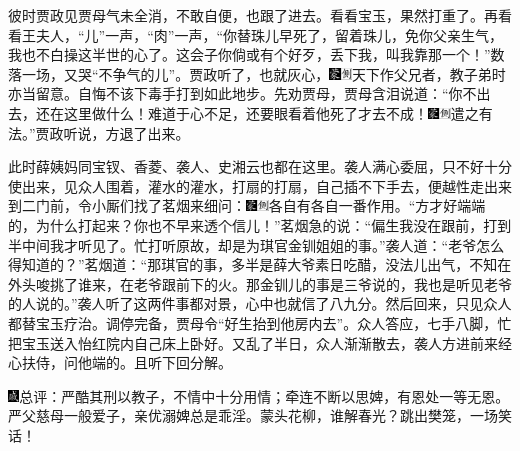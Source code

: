 彼时贾政见贾母气未全消，不敢自便，也跟了进去。看看宝玉，果然打重了。再看看王夫人，``儿''一声，``肉''一声，``你替珠儿早死了，留着珠儿，免你父亲生气，我也不白操这半世的心了。这会子你倘或有个好歹，丢下我，叫我靠那一个！''数落一场，又哭``不争气的儿''。贾政听了，也就灰心，{\includegraphics[width=3mm]{../Images/00006}\includegraphics[width=3mm]{../Images/00011}\footnotesize \kaishu 天下作父兄者，教子弟时亦当留意。}自悔不该下毒手打到如此地步。先劝贾母，贾母含泪说道：``你不出去，还在这里做什么！难道于心不足，还要眼看着他死了才去不成！{\includegraphics[width=3mm]{../Images/00006}\includegraphics[width=3mm]{../Images/00011}\footnotesize \kaishu 遣之有法。}''贾政听说，方退了出来。

此时薛姨妈同宝钗、香菱、袭人、史湘云也都在这里。袭人满心委屈，只不好十分使出来，见众人围着，灌水的灌水，打扇的打扇，自己插不下手去，便越性走出来到二门前，令小厮们找了茗烟来细问：{\includegraphics[width=3mm]{../Images/00006}\includegraphics[width=3mm]{../Images/00011}\footnotesize \kaishu 各自有各自一番作用。}``方才好端端的，为什么打起来？你也不早来透个信儿！''茗烟急的说：``偏生我没在跟前，打到半中间我才听见了。忙打听原故，却是为琪官金钏姐姐的事。''袭人道：``老爷怎么得知道的？''茗烟道：``那琪官的事，多半是薛大爷素日吃醋，没法儿出气，不知在外头唆挑了谁来，在老爷跟前下的火。那金钏儿的事是三爷说的，我也是听见老爷的人说的。''袭人听了这两件事都对景，心中也就信了八九分。然后回来，只见众人都替宝玉疗治。调停完备，贾母令``好生抬到他房内去''。众人答应，七手八脚，忙把宝玉送入怡红院内自己床上卧好。又乱了半日，众人渐渐散去，袭人方进前来经心扶侍，问他端的。且听下回分解。

{\includegraphics[width=3mm]{../Images/00005}总评：严酷其刑以教子，不情中十分用情；牵连不断以思婢，有恩处一等无恩。严父慈母一般爱子，亲优溺婢总是乖淫。蒙头花柳，谁解春光？跳出樊笼，一场笑话！}

